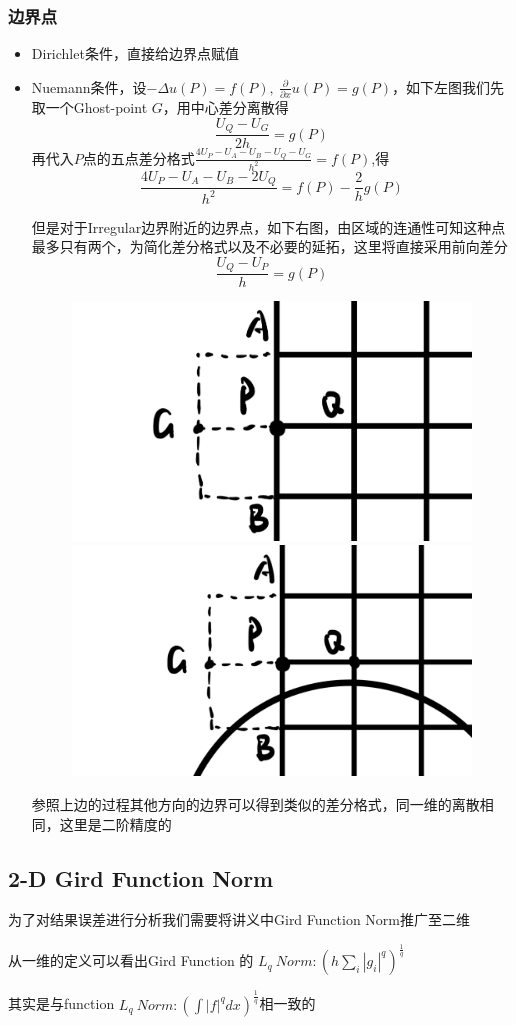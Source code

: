 \documentclass{article}
\begin{document}
\subsubsection{边界点}
\begin{itemize}
    \item Dirichlet条件，直接给边界点赋值
    \item Nuemann条件，设$-\Delta u(P)=f(P),\ \frac{\partial}{\partial x}u(P)=g(P)$，如下左图我们先取一个Ghost-point $G$，用中心差分离散得
    $$\frac{U_Q-U_G}{2h}=g(P)$$
    再代入$P$点的五点差分格式$\frac{4U_P-U_A-U_B-U_Q-U_G}{h^2} = f(P)$,得
    $$\frac{4U_P-U_A-U_B-2U_Q}{h^2} = f(P)-\frac{2}{h}g(P)$$
    
    但是对于Irregular边界附近的边界点，如下右图，由区域的连通性可知这种点最多只有两个，为简化差分格式以及不必要的延拓，这里将直接采用前向差分
    $$\frac{U_Q-U_P}{h}=g(P)$$
    \begin{figure}[h]
        \centering
        \includegraphics[width=0.4\linewidth]{discrete3.PNG}
        \includegraphics[width=0.4\linewidth]{discrete4.PNG}
    \end{figure}

    参照上边的过程其他方向的边界可以得到类似的差分格式，同一维的离散相同，这里是二阶精度的
\end{itemize}

\newpage

\subsection{2-D Gird Function Norm}
为了对结果误差进行分析我们需要将讲义中Gird Function Norm推广至二维

从一维的定义可以看出Gird Function 的 $L_q\ Norm: \left( h\sum_i |g_i|^q \right)^{\frac{1}{q}}$ 

其实是与function $L_q\ Norm:\left( \int |f|^qdx\right)^{\frac{1}{q}}$相一致的
\end{document}
